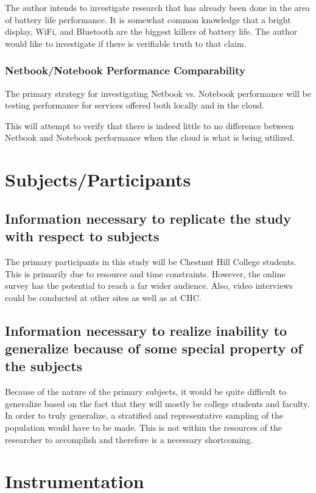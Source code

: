 \documentclass[12pt,oneside,letterpaper,titlepage]{article}
\begin{document}
The author intends to investigate research that has already been done in the
area of battery life performance.  It is somewhat common knowledge that a bright
display, WiFi, and Bluetooth are the biggest killers of battery life.  The
author would like to investigate if there is verifiable truth to that claim.

\subsubsection{Netbook/Notebook Performance Comparability}

The primary strategy for investigating Netbook vs. Notebook performance will be
testing performance for services offered both locally and in the cloud.

This will attempt to verify that there is indeed little to no difference between
Netbook and Notebook performance when the cloud is what is being utilized.

\section{Subjects/Participants}

\subsection{Information necessary to replicate the study with respect to subjects}

The primary participants in this study will be Chestnut Hill College students.
This is primarily due to resource and time constraints.  However, the online
survey has the potential to reach a far wider audience.  Also, video interviews
could be conducted at other sites as well as at CHC.

\subsection{Information necessary to realize inability to generalize because of some special property of the subjects}

Because of the nature of the primary subjects, it would be quite difficult to
generalize based on the fact that they will mostly be college students and
faculty.  In order to truly generalize, a stratified and representative sampling
of the population would have to be made.  This is not within the resources of
the researcher to accomplish and therefore is a necessary shortcoming.

\section{Instrumentation}
\end{document}
